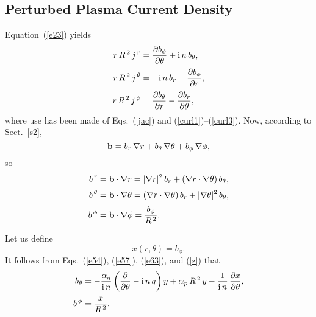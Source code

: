 \documentclass[12pt,prb,aps]{revtex4-1}
\begin{document}
\subsection{Perturbed Plasma Current Density}
Equation~(\ref{e23}) yields 
\begin{align}
r\,R^{\,2}\,j^{\,r} &= \frac{\partial b_\phi}{\partial\theta}+{\rm i}\,n\,b_\theta,\label{e57}\\[0.5ex]
r\,R^{\,2}\,j^{\,\theta} &=-{\rm i}\,n\,b_r -\frac{\partial b_\phi}{\partial r},\label{e58}\\[0.5ex]
r\,R^{\,2}\,j^{\,\phi}&= \frac{\partial b_\theta}{\partial r} -\frac{\partial b_r}{\partial \theta},\label{e59}
\end{align}
where use has been made of Eqs.~(\ref{jac}) and (\ref{curl1})--(\ref{curl3}). 
Now, according to Sect.~\ref{s2}, 
\begin{equation}
{\bf b} = b_r\,\nabla r + b_\theta\,\nabla\theta+b_\phi\,\nabla\phi,
\end{equation}
so
\begin{align}
b^{\,r} &= {\bf b}\cdot\nabla r = |\nabla r|^2\,b_r + (\nabla r\cdot\nabla\theta)\,b_\theta,\label{e61}\\[0.5ex]
b^{\,\theta} &= {\bf b}\cdot\nabla \theta = (\nabla r\cdot\nabla\theta)\,b_r + |\nabla\theta|^2\,b_\theta,\label{e62}\\[0.5ex]
b^{\,\phi}&={\bf b}\cdot\nabla\phi =\frac{b_\phi}{R^{\,2}}.\label{e63}
\end{align}

Let us define
\begin{equation}\label{z}
x(r,\theta) = b_\phi.
\end{equation}
It follows from Eqs.~(\ref{e54}), (\ref{e57}), (\ref{e63}), and (\ref{z}) that
\begin{align}
b_\theta &= -\frac{\alpha_g}{{\rm i}\,n}\left(\frac{\partial}{\partial \theta}-{\rm i}\,n\,q\right)y+\alpha_p\,R^{\,2}\,y- \frac{1}{{\rm i}\,n}\,\frac{\partial x}{\partial \theta},\label{e65}\\[0.5ex]
b^{\,\phi}&=\frac{x}{R^{\,2}}.\label{e66}
\end{align}
\end{document}

